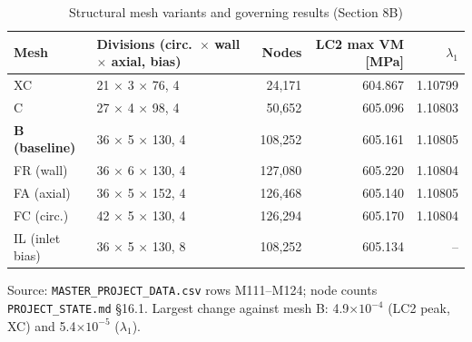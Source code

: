 \begin{table}[htbp]
\centering
\footnotesize
\caption{Structural mesh variants and governing results (Section 8B)}
\label{tab:smesh}
\begin{tabular}{llrrr}
\toprule
Mesh & Divisions (circ.\ $\times$ wall $\times$ axial, bias) & Nodes & LC2 max VM [MPa] & $\lambda_1$ \\
\midrule
XC & 21 $\times$ 3 $\times$ 76, 4 & 24,171 & 604.867 & 1.10799 \\
C & 27 $\times$ 4 $\times$ 98, 4 & 50,652 & 605.096 & 1.10803 \\
\textbf{B (baseline)} & 36 $\times$ 5 $\times$ 130, 4 & 108,252 & 605.161 & 1.10805 \\
FR (wall) & 36 $\times$ 6 $\times$ 130, 4 & 127,080 & 605.220 & 1.10804 \\
FA (axial) & 36 $\times$ 5 $\times$ 152, 4 & 126,468 & 605.140 & 1.10805 \\
FC (circ.) & 42 $\times$ 5 $\times$ 130, 4 & 126,294 & 605.170 & 1.10804 \\
IL (inlet bias) & 36 $\times$ 5 $\times$ 130, 8 & 108,252 & 605.134 & -- \\
\bottomrule
\end{tabular}
\par\smallskip\parbox{\linewidth}{\footnotesize\raggedright Source: \texttt{MASTER\_PROJECT\_DATA.csv} rows M111--M124; node counts \texttt{PROJECT\_STATE.md} \S16.1. Largest change against mesh B: 4.9$\times10^{-4}$ (LC2 peak, XC) and 5.4$\times10^{-5}$ ($\lambda_1$).}
\end{table}
